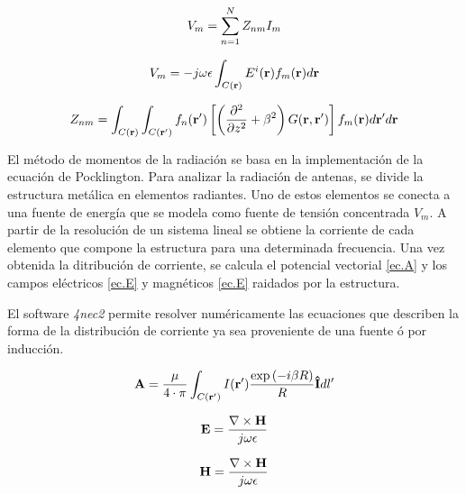 \begin{equation}
	\centering
	V_m = \sum_{n=1}^N Z_{nm} I_m
\end{equation}

\begin{equation}
	\centering
	V_m = -j\omega \epsilon \int_{C(\bold{r})} E^i (\bold{r}) f_m(\bold{r}) d\bold{r}
\end{equation}	

\begin{equation}
	\centering
	Z_{nm} = \int_{C(\bold{r})} \int_{C(\bold{r'})} f_n(\bold{r'})\left[ \left(\frac{\partial^2}{\partial{z^2}} + \beta ^2 \right) G(\bold{r},\bold{r'}) \right] f_m(\bold{r}) d\bold{r'} d\bold{r}
\end{equation}


El método de momentos de la radiación se basa en la implementación de la ecuación de Pocklington. Para analizar la radiación de antenas, se divide la estructura metálica en elementos radiantes. Uno de estos elementos se conecta a una fuente de energía que se modela como fuente de tensión concentrada $V_m$. A partir de la resolución de un sistema lineal se obtiene la corriente de cada elemento que compone la estructura para una determinada frecuencia. Una vez obtenida la ditribución de corriente, se calcula el potencial vectorial \eqref{ec.A} y los campos eléctricos \eqref{ec.E} y magnéticos \eqref{ec.E} raidados por la estructura.

El software \textit{4nec2} permite resolver numéricamente las ecuaciones que describen la forma de la distribución de corriente ya sea proveniente de una fuente ó por inducción.

\begin{equation}
	\centering
	\bold{A} = \frac{\mu}{4 \cdot \pi} \int_{C(\bold{r'})} I(\bold{r'}) \frac{ \exp{(-i\beta R)} }{R} \bold{\hat{I}} dl'
	\label{ec.A}
\end{equation}	

\begin{equation}
	\centering
	\bold{E} = \frac{\nabla \times \bold{H} }{ j\omega\epsilon}
	\label{ec.E}
\end{equation}	

\begin{equation}
	\centering
	\bold{H} = \frac{\nabla \times \bold{H}}{j\omega \epsilon}
	\label{ec.H}
\end{equation}

	